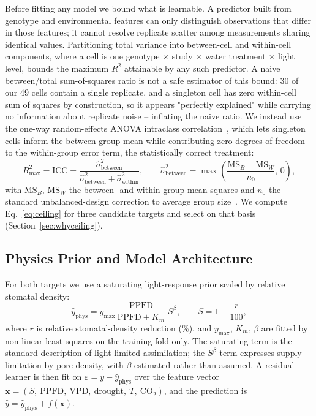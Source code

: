 \documentclass[runningheads]{llncs}
\begin{document}
Before fitting any model we bound what is learnable. A predictor built from genotype and environmental features can only distinguish observations that differ in those features; it cannot resolve replicate scatter among measurements sharing identical values. Partitioning total variance into between-cell and within-cell components, where a cell is one genotype $\times$ study $\times$ water treatment $\times$ light level, bounds the maximum $R^{2}$ attainable by any such predictor. A naive between/total sum-of-squares ratio is not a safe estimator of this bound: 30 of our 49 cells contain a single replicate, and a singleton cell has zero within-cell sum of squares by construction, so it appears "perfectly explained" while carrying no information about replicate noise -- inflating the naive ratio. We instead use the one-way random-effects ANOVA intraclass correlation~\cite{ref_searle}, which lets singleton cells inform the between-group mean while contributing zero degrees of freedom to the within-group error term, the statistically correct treatment:
\begin{equation}\label{eq:ceiling}
R^{2}_{\max} = \mathrm{ICC} = \frac{\hat{\sigma}^{2}_{\text{between}}}{\hat{\sigma}^{2}_{\text{between}} + \hat{\sigma}^{2}_{\text{within}}},
\qquad
\hat{\sigma}^{2}_{\text{between}} = \max\!\left(\frac{\mathrm{MS}_{B}-\mathrm{MS}_{W}}{n_0},\,0\right),
\end{equation}
with $\mathrm{MS}_B$, $\mathrm{MS}_W$ the between- and within-group mean squares and $n_0$ the standard unbalanced-design correction to average group size~\cite{ref_searle}. We compute Eq.~\ref{eq:ceiling} for three candidate targets and select on that basis (Section~\ref{sec:whyceiling}).

\subsection{Physics Prior and Model Architecture}\label{sec:model}

For both targets we use a saturating light-response prior scaled by relative stomatal density:
\begin{equation}\label{eq:phys}
\hat{y}_{\text{phys}} = y_{\max}\,\frac{\mathrm{PPFD}}{\mathrm{PPFD}+K_m}\;S^{\beta},
\qquad S = 1 - \frac{r}{100},
\end{equation}
where $r$ is relative stomatal-density reduction (\%), and $y_{\max}$, $K_m$, $\beta$ are fitted by non-linear least squares on the training fold only. The saturating term is the standard description of light-limited assimilation; the $S^{\beta}$ term expresses supply limitation by pore density, with $\beta$ estimated rather than assumed. A residual learner is then fit on $\varepsilon = y - \hat{y}_{\text{phys}}$ over the feature vector $\mathbf{x} = (S,\ \mathrm{PPFD},\ \mathrm{VPD},\ \mathrm{drought},\ T,\ \mathrm{CO}_2)$, and the prediction is $\hat{y} = \hat{y}_{\text{phys}} + f(\mathbf{x})$.
\end{document}

